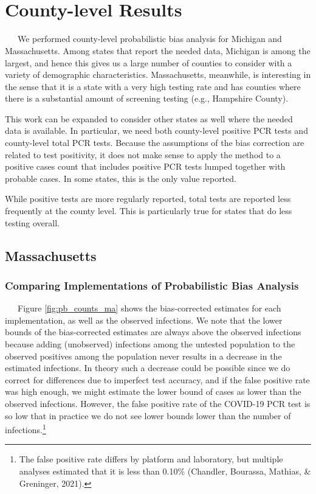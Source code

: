 \documentclass[12pt,twoside]{smiththesis}
\begin{document}
~

~

\hypertarget{county-level-results}{%
\section{County-level Results}\label{county-level-results}}

~~~We performed county-level probabilistic bias analysis for Michigan and Massachusetts. Among states that report the needed data, Michigan is among the largest, and hence this gives us a large number of counties to consider with a variety of demographic characteristics. Massachusetts, meanwhile, is interesting in the sense that it is a state with a very high testing rate and has counties where there is a substantial amount of screening testing (e.g., Hampshire County).

This work can be expanded to consider other states as well where the needed data is available. In particular, we need both county-level positive PCR tests and county-level total PCR tests. Because the assumptions of the bias correction are related to test positivity, it does not make sense to apply the method to a positive cases count that includes positive PCR tests lumped together with probable cases. In some states, this is the only value reported.

While positive tests are more regularly reported, total tests are reported less frequently at the county level. This is particularly true for states that do less testing overall.

\hypertarget{massachusetts}{%
\subsection{Massachusetts}\label{massachusetts}}

\hypertarget{comparing-implementations-of-probabilistic-bias-analysis}{%
\subsubsection{Comparing Implementations of Probabilistic Bias Analysis}\label{comparing-implementations-of-probabilistic-bias-analysis}}

~~~Figure \ref{fig:pb_counts_ma} shows the bias-corrected estimates for each implementation, as well as the observed infections. We note that the lower bounds of the bias-corrected estimates are always above the observed infections because adding (unobserved) infections among the untested population to the observed positives among the population never results in a decrease in the estimated infections. In theory such a decrease could be possible since we do correct for differences due to imperfect test accuracy, and if the false positive rate was high enough, we might estimate the lower bound of cases as lower than the observed infections. However, the false positive rate of the COVID-19 PCR test is so low that in practice we do not see lower bounds lower than the number of infections.\footnote{The false positive rate differs by platform and laboratory, but multiple analyses estimated that it is less than 0.10\% (Chandler, Bourassa, Mathias, \& Greninger, 2021).}
\end{document}
